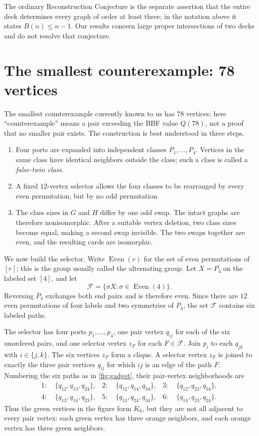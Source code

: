 \documentclass[11pt]{article}
\newcommand{\Even}{\operatorname{Even}}
\begin{document}
The ordinary Reconstruction Conjecture is the separate assertion that the entire deck determines every
graph of order at least three; in the notation above it states $B(n)\le n-1$. Our results concern large
proper intersections of two decks and do not resolve that conjecture.

\section{The smallest counterexample: 78 vertices}\label{sec:78}
The smallest counterexample currently known to us has $78$ vertices; here ``counterexample'' means a
pair exceeding the BBF value $Q(78)$, not a proof that no smaller pair exists. The construction is best
understood in three steps.
\begin{enumerate}
\item Four ports are expanded into independent classes $P_1,\ldots,P_4$. Vertices in the same class
have identical neighbors outside the class; such a class is called a \emph{false-twin class}.
\item A fixed $12$-vertex selector allows the four classes to be rearranged by every even permutation,
but by no odd permutation.
\item The class sizes in $G$ and $H$ differ by one odd swap. The intact graphs are therefore
nonisomorphic. After a suitable vertex deletion, two class sizes become equal, making a second swap
invisible. The two swaps together are even, and the resulting cards are isomorphic.
\end{enumerate}

We now build the selector. Write $\Even(r)$ for the set of even permutations of $[r]$; this is the
group usually called the alternating group. Let $X=P_4$ on the labeled set $[4]$, and let
\[
 \mathcal F=\{\sigma X:\sigma\in\Even(4)\}.
\]
Reversing $P_4$ exchanges both end pairs and is therefore even. Since there are $12$ even
permutations of four labels and two symmetries of $P_4$, the set $\mathcal F$ contains six labeled
paths.

The selector has four ports $p_1,\dots,p_4$, one pair vertex $q_{ij}$ for each of the six unordered
pairs, and one selector vertex $z_F$ for each $F\in\mathcal F$. Join $p_i$ to each $q_{jk}$ with
$i\in\{j,k\}$. The six vertices $z_F$ form a clique. A selector vertex $z_F$ is joined to exactly the
three pair vertices $q_{ij}$ for which $ij$ is an edge of the path $F$. Numbering the six paths as in
\cref{fig:gadget}, their pair-vertex neighborhoods are
\begin{align*}
1:&\ \{q_{12},q_{13},q_{24}\}, &
2:&\ \{q_{12},q_{14},q_{34}\}, &
3:&\ \{q_{12},q_{23},q_{34}\},\\
4:&\ \{q_{13},q_{14},q_{23}\}, &
5:&\ \{q_{13},q_{24},q_{34}\}, &
6:&\ \{q_{14},q_{23},q_{24}\}.
\end{align*}
Thus the green vertices in the figure form $K_6$, but they are not all adjacent to every pair vertex:
each green vertex has three orange neighbors, and each orange vertex has three green neighbors.
\end{document}

